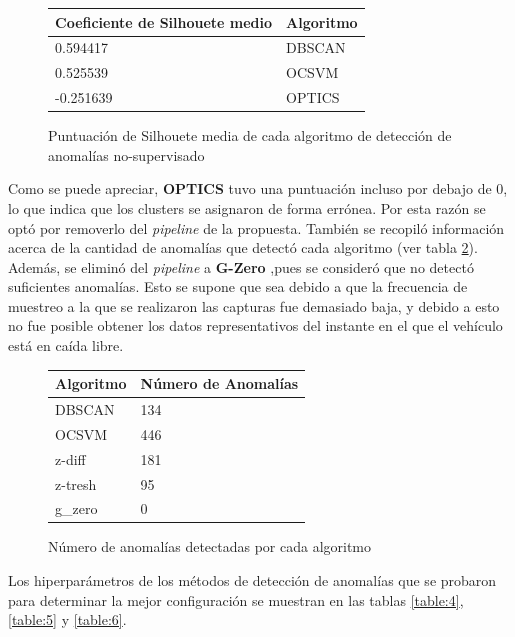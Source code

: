 		\begin{figure}[htb]
			\centering
			\begin{tabular}{ll}
			\toprule
			   Coeficiente de Silhouete medio & Algoritmo \\
			\midrule
			   0.594417 &    DBSCAN \\
			   0.525539 &     OCSVM \\
			  -0.251639 &    OPTICS \\
			\bottomrule
			\end{tabular}
			\caption{Puntuación de Silhouete media de cada algoritmo de detección de anomalías no-supervisado}
			\label{table:2}
		\end{figure}

		Como se puede apreciar, \textbf{OPTICS} tuvo una puntuación incluso por debajo de 0, lo que indica que los clusters se asignaron de 
		forma errónea. Por esta razón se optó por removerlo del \emph{pipeline} de la propuesta. También se recopiló información acerca de la
		cantidad de anomalías que detectó cada algoritmo (ver tabla \ref{table:3}). Además,  se eliminó del \emph{pipeline} a \textbf{G-Zero}
		,pues se consideró que no detectó suficientes anomalías.  Esto se supone que sea debido a que la frecuencia de muestreo a la que se 
		realizaron las capturas fue demasiado baja, y debido a esto no fue posible obtener los datos representativos del instante en el que 
		el vehículo está en caída libre.

		\begin{figure}[htb]
			\centering
			\begin{tabular}{ll}
				\toprule
				 Algoritmo &  Número de Anomalías \\
				\midrule
				    DBSCAN &                  134 \\
				     OCSVM &                  446 \\
				    z-diff &                  181 \\
				   z-tresh &                   95 \\
				    g\_zero &                    0 \\
				\bottomrule
			\end{tabular}
			\caption{Número de anomalías detectadas por cada algoritmo}
			\label{table:3}
		\end{figure}

		Los hiperparámetros de los métodos de detección de anomalías que se probaron para determinar la mejor configuración se muestran en las tablas 
		\ref{table:4}, \ref{table:5} y \ref{table:6}.

